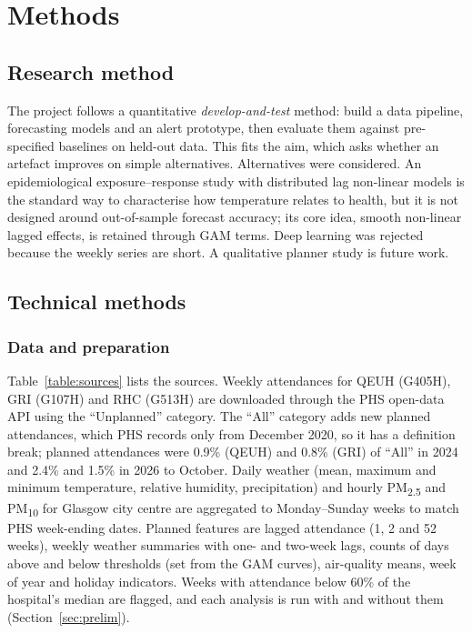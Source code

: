 \documentclass[12pt]{article}
\begin{document}
\section{Methods}\label{sec:methods}

\subsection{Research method}
The project follows a quantitative \emph{develop-and-test} method: build a data pipeline, forecasting models and an alert prototype, then evaluate them against pre-specified baselines on held-out data. This fits the aim, which asks whether an artefact improves on simple alternatives. Alternatives were considered. An epidemiological exposure--response study with distributed lag non-linear models \parencite{gasparrini2010,wan2022} is the standard way to characterise how temperature relates to health, but it is not designed around out-of-sample forecast accuracy; its core idea, smooth non-linear lagged effects, is retained through GAM terms. Deep learning was rejected because the weekly series are short. A qualitative planner study is future work.

\subsection{Technical methods}
\subsubsection{Data and preparation}
Table~\ref{table:sources} lists the sources. Weekly attendances for QEUH (G405H), GRI (G107H) and RHC (G513H) are downloaded through the PHS open-data API using the ``Unplanned'' category. The ``All'' category adds new planned attendances, which PHS records only from December 2020, so it has a definition break; planned attendances were 0.9\% (QEUH) and 0.8\% (GRI) of ``All'' in 2024 and 2.4\% and 1.5\% in 2026 to October. Daily weather (mean, maximum and minimum temperature, relative humidity, precipitation) and hourly PM\textsubscript{2.5} and PM\textsubscript{10} for Glasgow city centre are aggregated to Monday--Sunday weeks to match PHS week-ending dates. Planned features are lagged attendance (1, 2 and 52 weeks), weekly weather summaries with one- and two-week lags, counts of days above and below thresholds (set from the GAM curves), air-quality means, week of year and holiday indicators. Weeks with attendance below 60\% of the hospital's median are flagged, and each analysis is run with and without them (Section~\ref{sec:prelim}).
\end{document}
